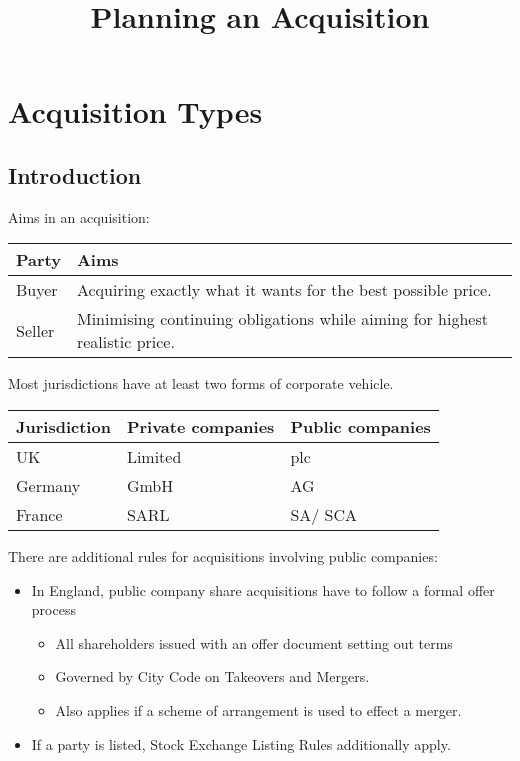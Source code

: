 \documentclass[
]{article}
\title{Planning an Acquisition}
\author{}
\date{}
\providecommand{\tightlist}{%
  \setlength{\itemsep}{0pt}\setlength{\parskip}{0pt}}
\begin{document}
\maketitle

{
\setcounter{tocdepth}{3}
\tableofcontents
}
\hypertarget{acquisition-types}{%
\section{Acquisition Types}\label{acquisition-types}}

\hypertarget{introduction}{%
\subsection{Introduction}\label{introduction}}

Aims in an acquisition:

\begin{longtable}[]{@{}ll@{}}
\toprule()
Party & Aims \\
\midrule()
\endhead
Buyer & Acquiring exactly what it wants for the best possible price. \\
Seller & Minimising continuing obligations while aiming for highest
realistic price. \\
\bottomrule()
\end{longtable}

Most jurisdictions have at least two forms of corporate vehicle.

\begin{longtable}[]{@{}lll@{}}
\toprule()
Jurisdiction & Private companies & Public companies \\
\midrule()
\endhead
UK & Limited & plc \\
Germany & GmbH & AG \\
France & SARL & SA/ SCA \\
\bottomrule()
\end{longtable}

There are additional rules for acquisitions involving public companies:

\begin{itemize}
\tightlist
\item
  In England, public company share acquisitions have to follow a formal
  offer process

  \begin{itemize}
  \tightlist
  \item
    All shareholders issued with an offer document setting out terms
  \item
    Governed by City Code on Takeovers and Mergers.
  \item
    Also applies if a scheme of arrangement is used to effect a merger.
  \end{itemize}
\item
  If a party is listed, Stock Exchange Listing Rules additionally apply.
\end{itemize}
\end{document}
